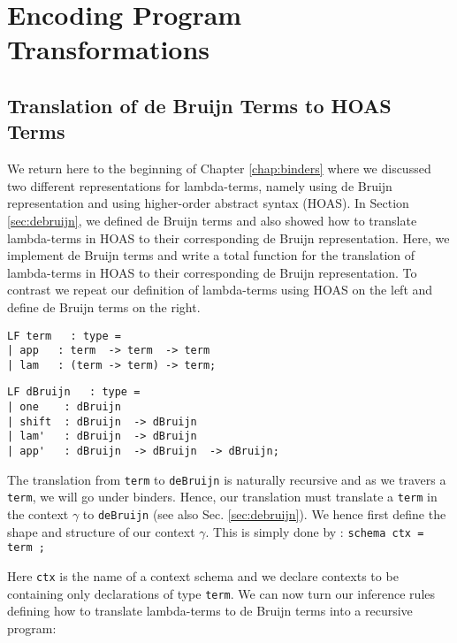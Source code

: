 \chapter{Encoding Program Transformations }
\section{Translation of de Bruijn Terms to HOAS Terms} 
We return here to the beginning of Chapter \ref{chap:binders} where we discussed two different representations for lambda-terms, namely using de Bruijn representation and using higher-order abstract syntax (HOAS). In Section \ref{sec:debruijn}, we defined de Bruijn terms and also showed how to translate lambda-terms in HOAS to their corresponding de Bruijn representation. Here, we implement de Bruijn terms and write a total function for the translation of lambda-terms in HOAS to their corresponding  de Bruijn representation.  To contrast we repeat our definition of lambda-terms using HOAS on the left and define de Bruijn terms on the right. 

\begin{minipage}[t]{7cm}
\begin{lstlisting}
LF term   : type =
| app   : term  -> term  -> term
| lam   : (term -> term) -> term;
  \end{lstlisting}
\end{minipage}
\begin{minipage}[t]{7cm}
\begin{lstlisting}
LF dBruijn   : type =
| one    : dBruijn
| shift  : dBruijn  -> dBruijn
| lam'   : dBruijn  -> dBruijn
| app'   : dBruijn  -> dBruijn  -> dBruijn;
\end{lstlisting}
\end{minipage}

The translation from \lstinline!term! to \lstinline!deBruijn! is naturally recursive and as we travers a \lstinline!term!, we will go under binders. Hence, our translation must translate a \lstinline!term! in the context $\gamma$ to \lstinline!deBruijn! (see also Sec. \ref{sec:debruijn}). 
We hence first define the shape and structure of our context $\gamma$. This is
simply done by : \lstinline!schema ctx = term ; !


Here \lstinline!ctx! is the name of a context schema and we declare
contexts to be containing only declarations of type \lstinline!term!.
We can now turn our inference rules defining how to translate
lambda-terms to de Bruijn terms into a recursive program:


